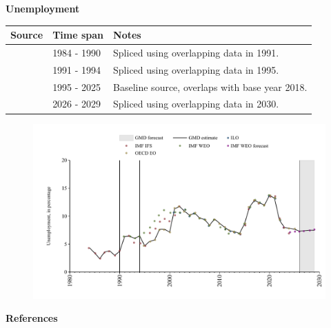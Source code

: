 \documentclass[12pt,a4paper,landscape]{article}
\begin{document}
\begin{adjustbox}{max totalsize={\paperwidth}{\paperheight},center}
\begin{minipage}[t][\textheight][t]{\textwidth}
\vspace*{0.5cm}
{}
\begin{center}
{\Large\bfseries Unemployment}
\end{center}
\vspace{0.5cm}
\begin{table}[H]
\centering
\small
\begin{tabular}{|l|l|l|}
\hline
\textbf{Source} & \textbf{Time span} & \textbf{Notes} \\
\hline
\rowcolor{white}\cite{IMF_IFS}& 1984 - 1990 &Spliced using overlapping data in 1991. \\
\rowcolor{lightgray}\cite{IMF_WEO}& 1991 - 1994 &Spliced using overlapping data in 1995. \\
\rowcolor{white}\cite{OECD_EO}& 1995 - 2025 &Baseline source, overlaps with base year 2018. \\
\rowcolor{lightgray}\cite{IMF_WEO_forecast}& 2026 - 2029 &Spliced using overlapping data in 2030. \\
\hline
\end{tabular}
\end{table}
\begin{figure}[H]
\centering
\includegraphics[width=\textwidth,height=0.6\textheight,keepaspectratio]{graphs/BRA_unemp.pdf}
\end{figure}
\end{minipage}
\end{adjustbox}
{}
\begin{center}
{\Large\bfseries References}
\end{center}
\small


\end{document}
